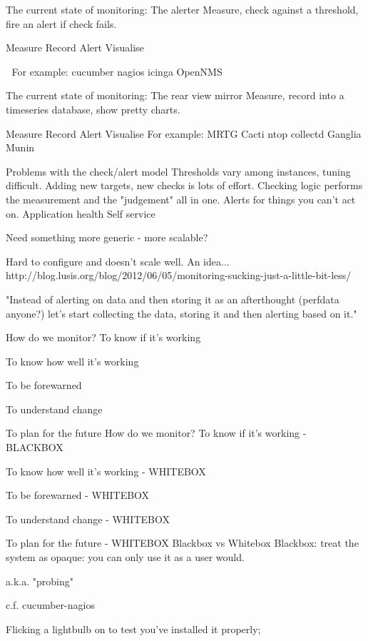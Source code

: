 \documentclass[online,helvetica]{chaksem}
\begin{document}
The current state of monitoring:
The alerter
Measure, check against a threshold, fire an alert if check fails.

Measure
Record
Alert
Visualise



For example:
cucumber
nagios
icinga
OpenNMS

The current state of monitoring:
The rear view mirror
Measure, record into a timeseries database, show pretty charts.

Measure
Record
Alert
Visualise
For example:
MRTG
Cacti
ntop 
collectd
Ganglia
Munin

Problems with the check/alert model
Thresholds vary among instances, tuning difficult.
Adding new targets, new checks is lots of effort.
Checking logic performs the measurement and the "judgement" all in one.
Alerts for things you can't act on.
Application health
Self service

Need something more generic - more scalable?



Hard to configure and doesn't scale well.
An idea...
http://blog.lusis.org/blog/2012/06/05/monitoring-sucking-just-a-little-bit-less/

"Instead of alerting on data and then storing it as an afterthought (perfdata anyone?) let’s start collecting the
data, storing it and then alerting based on it."


How do we monitor?
To know if it's working

To know how well it's working

To be forewarned

To understand change

To plan for the future
How do we monitor?
To know if it's working - BLACKBOX

To know how well it's working - WHITEBOX

To be forewarned - WHITEBOX

To understand change - WHITEBOX

To plan for the future - WHITEBOX
Blackbox vs Whitebox
Blackbox: treat the system as opaque: you can only use it as a user would.

a.k.a. "probing"

c.f. cucumber-nagios

Flicking a lightbulb on to test you've installed it properly;                                                                                                  
                                                                                                                                                               
\end{document}
